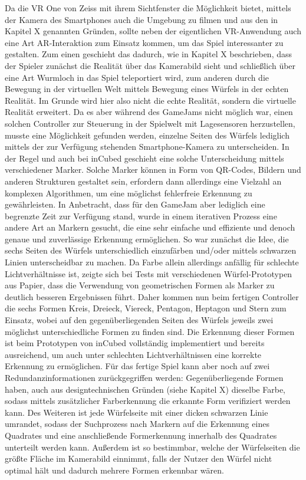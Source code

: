 
Da die VR One von Zeiss mit ihrem Sichtfenster die Möglichkeit bietet, mittels der Kamera des Smartphones auch die Umgebung zu filmen und aus den in Kapitel X genannten Gründen, sollte neben der eigentlichen VR-Anwendung auch eine Art AR-Interaktion zum Einsatz kommen, um das Spiel interessanter zu gestalten. Zum einen geschieht das dadurch, wie in Kapitel X beschrieben, dass der Spieler zunächst die Realität über das Kamerabild sieht und schließlich über eine Art Wurmloch in das Spiel teleportiert wird, zum anderen durch die Bewegung in der virtuellen Welt mittels Bewegung eines Würfels in der echten Realität. Im Grunde wird hier also nicht die echte Realität, sondern die virtuelle Realität erweitert. Da es aber während des GameJams nicht möglich war, einen solchen Controller zur Steuerung in der Spielwelt mit Lagesensoren herzustellen, musste eine Möglichkeit gefunden werden, einzelne Seiten des Würfels lediglich mittels der zur Verfügung stehenden Smartphone-Kamera zu unterscheiden. In der Regel und auch bei inCubed geschieht eine solche Unterscheidung mittels verschiedener Marker. Solche Marker können in Form von QR-Codes, Bildern und anderen Strukturen gestaltet sein, erfordern dann allerdings eine Vielzahl an komplexen Algorithmen, um eine möglichst fehlerfreie Erkennung zu gewährleisten. In Anbetracht, dass für den GameJam aber lediglich eine begrenzte Zeit zur Verfügung stand, wurde in einem iterativen Prozess eine andere Art an Markern gesucht, die eine sehr einfache und effiziente und denoch genaue und zuverlässige Erkennung ermöglichen. So war zunächst die Idee, die sechs Seiten des Würfels unterschiedlich einzufärben und/oder mittels schwarzen Linien unterscheidbar zu machen. Da Farbe allein allerdings anfällig für schlechte Lichtverhältnisse ist, zeigte sich bei Tests mit verschiedenen Würfel-Prototypen aus Papier, dass die Verwendung von geometrischen Formen als Marker zu deutlich besseren Ergebnissen führt. Daher kommen nun beim fertigen Controller die sechs Formen Kreis, Dreieck, Viereck, Pentagon, Heptagon und Stern zum Einsatz, wobei auf den gegenüberliegenden Seiten des Würfels jeweils zwei möglichst unterschiedliche Formen zu finden sind. Die Erkennung dieser Formen ist beim Prototypen von inCubed vollständig implementiert und bereits ausreichend, um auch unter schlechten Lichtverhältnissen eine korrekte Erkennung zu ermöglichen. Für das fertige Spiel kann aber noch auf zwei Redundanzinformationen zurückgegriffen werden: Gegenüberliegende Formen haben, auch aus designtechnischen Gründen (siehe Kapitel X) dieselbe Farbe, sodass mittels zusätzlicher Farberkennung die erkannte Form verifiziert werden kann. Des Weiteren ist jede Würfelseite mit einer dicken schwarzen Linie umrandet, sodass der Suchprozess nach Markern auf die Erkennung eines Quadrates und eine anschließende Formerkennung innerhalb des Quadrates unterteilt werden kann. Außerdem ist so bestimmbar, welche der Würfelseiten die größte Fläche im Kamerabild einnimmt, falls der Nutzer den Würfel nicht optimal hält und dadurch mehrere Formen erkennbar wären.

